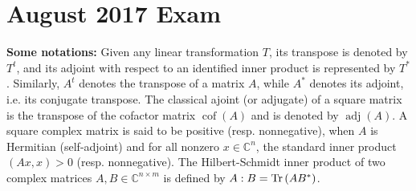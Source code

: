 \documentclass[11pt]{article}
\theoremstyle{definition}
\numberwithin{equation}{subsection}
\begin{document}
\newpage

\section{August 2017 Exam}

{\bf Some notations:} Given any linear transformation $T$, its transpose is denoted by $T^t$, and its adjoint with respect to an identified inner product is represented by $T^*$. Similarly, $A^t$ denotes the transpose of a matrix $A$, while $A^*$ denotes its adjoint, i.e. its conjugate transpose. The classical ajoint (or adjugate) of a square matrix is the transpose of the cofactor matrix $\operatorname{cof}(A)$ and is denoted by $\operatorname{adj}(A)$. A square complex matrix is said to be positive (resp. nonnegative), when $A$ is Hermitian (self-adjoint) and for all nonzero $x \in \mathbb{C}^n$, the standard inner product $(Ax, x) > 0$ (resp. nonnegative). The Hilbert-Schmidt inner product of two complex matrices $A, B \in \mathbb{C}^{n \times m}$ is defined by $A : B = \Tr \left(AB^*\right)$.

\medskip
\end{document}
